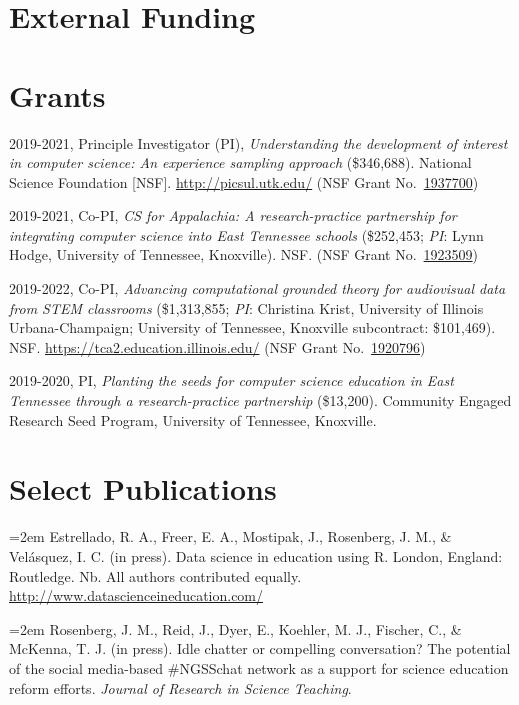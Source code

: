 \documentclass[11pt, a4paper]{awesome-cv}
\begin{document}
\hypertarget{external-funding}{%
\section{External Funding}\label{external-funding}}

\hypertarget{grants}{%
\section{Grants}\label{grants}}

2019-2021, Principle Investigator (PI), \emph{Understanding the development of interest in computer science: An experience sampling approach} (\$346,688). National Science Foundation {[}NSF{]}. \url{http://picsul.utk.edu/} (NSF Grant No.~\href{https://www.nsf.gov/awardsearch/showAward?AWD_ID=1937700\&HistoricalAwards=false}{1937700})

2019-2021, Co-PI, \emph{CS for Appalachia: A research-practice partnership for integrating computer science into East Tennessee schools} (\$252,453; \emph{PI}: Lynn Hodge, University of Tennessee, Knoxville). NSF. (NSF Grant No.~\href{https://www.nsf.gov/awardsearch/showAward?AWD_ID=1923509\&HistoricalAwards=false}{1923509})

2019-2022, Co-PI, \emph{Advancing computational grounded theory for audiovisual data from STEM classrooms} (\$1,313,855; \emph{PI}: Christina Krist, University of Illinois Urbana-Champaign; University of Tennessee, Knoxville subcontract: \$101,469). NSF. \url{https://tca2.education.illinois.edu/} (NSF Grant No.~\href{https://www.nsf.gov/awardsearch/showAward?AWD_ID=1920796\&HistoricalAwards=false}{1920796})

2019-2020, PI, \emph{Planting the seeds for computer science education in East Tennessee through a research-practice partnership} (\$13,200). Community Engaged Research Seed Program, University of Tennessee, Knoxville.

\hypertarget{select-publications}{%
\section{Select Publications}\label{select-publications}}

\hangindent=2em
Estrellado, R. A., Freer, E. A., Mostipak, J., Rosenberg, J. M., \& Velásquez, I. C. (in press). Data science in education using R. London, England: Routledge. Nb. All authors contributed equally. \url{http://www.datascienceineducation.com/}

\hangindent=2em
Rosenberg, J. M., Reid, J., Dyer, E., Koehler, M. J., Fischer, C., \& McKenna, T. J. (in press). Idle chatter or compelling conversation? The potential of the social media-based \#NGSSchat network as a support for science education reform efforts. \emph{Journal of Research in Science Teaching}.
\end{document}
